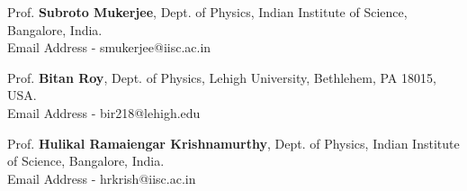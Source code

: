 

\begin{cventries}


\begin{cvitems}

  \item{Prof. \textbf{Subroto Mukerjee},} %
	{Dept. of Physics, Indian Institute of Science, Bangalore, India.} %
	{} %
	{\\}
	{Email Address - smukerjee@iisc.ac.in} %
  \item{Prof. \textbf{Bitan Roy},} %
	{Dept. of Physics, Lehigh University, Bethlehem, PA 18015, USA.} %
	{} %
	{\\}
	{Email Address - bir218@lehigh.edu} %

  \item{Prof. \textbf{Hulikal Ramaiengar Krishnamurthy},} %
	{Dept. of Physics, Indian Institute of Science, Bangalore, India.} %
    {} %
    {\\}
    {Email Address - hrkrish@iisc.ac.in} %

\end{cvitems}
\end{cventries}
